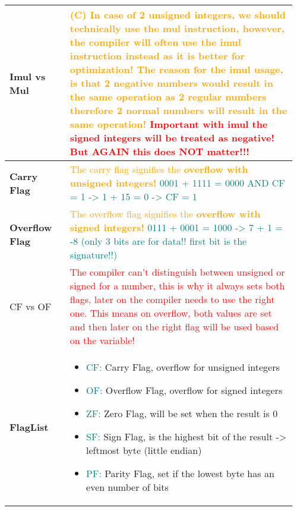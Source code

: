 \documentclass[main.tex,fontsize=8pt,paper=a4,paper=portrait,DIV=calc,]{scrartcl}
\begin{document}
\begin{table}[ht!]
\begin{tabular}{|m{0.2\linewidth}|m{0.755\linewidth}|}
\hline
\textbf{Imul vs Mul} & 
\textcolor{orange}{(C) In case of 2 unsigned integers, we should technically use the mul instruction,\newline
however, the compiler will often use the imul instruction instead as it is better for optimization!\newline
The reason for the imul usage, is that 2 negative numbers would result in the same operation as 2 regular numbers\newline 
therefore 2 normal numbers will result in the same operation!}\newline
\textcolor{red}{Important with imul the signed integers will be treated as negative! But AGAIN this does \textbf{NOT} matter!!!}\\
\hline
\textbf{Carry Flag} & 
\textcolor{orange}{The carry flag signifies the \textbf{overflow with unsigned integers!}}\newline
\textcolor{teal}{0001 + 1111 = 0000 AND CF = 1 -> 1 + 15 = 0 -> CF = 1}\\ 
\hline
\textbf{Overflow Flag} & 
\textcolor{orange}{The  overflow flag signifies the \textbf{overflow with signed integers!}}\newline
\textcolor{teal}{0111 + 0001 = 1000 -> 7 + 1 = -8 (only 3 bits are for data!! first bit is the signature!!)}\\
\hline
CF vs OF &
\textcolor{red}{The compiler can't distinguish between unsigned or signed for a number, this is why it always sets both flags, later on the compiler needs to use the right one.\newline
This means on overflow, both values are set and then later on the right flag will be used based on the variable!}\\
\hline
\textbf{FlagList} & 
\vspace{2mm}
\begin{itemize}
\item \textcolor{teal}{CF:} Carry Flag, overflow for unsigned integers 
\item \textcolor{teal}{OF:} Overflow Flag, overflow for signed integers
\item \textcolor{teal}{ZF:} Zero Flag, will be set when the result is 0
\item \textcolor{teal}{SF:} Sign Flag, is the highest bit of the result -> leftmost byte (little endian)
\item \textcolor{teal}{PF:} Parity Flag, set if the lowest byte has an even number of bits

\end{itemize}
\end{tabular}
\end{table}
\end{document}
